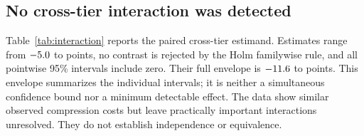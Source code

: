 \documentclass[11pt]{article}
\begin{document}
\subsection{No cross-tier interaction was detected}\label{sec:interaction}

Table~\ref{tab:interaction} reports the paired cross-tier estimand. Estimates
range from $-5.0$ to \PtwoInterDeltaMax{} points, no contrast is
rejected by the Holm familywise rule, and all pointwise 95\% intervals include
zero. Their full envelope is $-11.6$ to \PtwoInterCiHighMax{}
points. This envelope summarizes the individual intervals; it is neither a
simultaneous confidence bound nor a minimum detectable effect. The data show
similar observed compression costs but leave practically important interactions
unresolved. They do not establish independence or equivalence.
\end{document}
